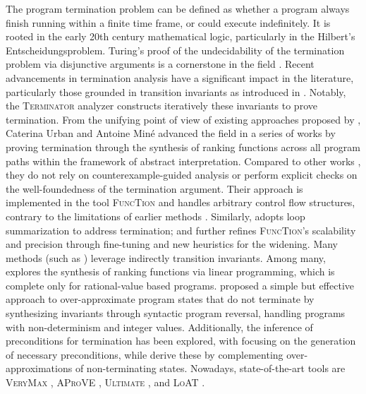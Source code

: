 The program termination problem can be defined as whether a program always finish running within a finite time frame, or could execute indefinitely.
It is rooted in the early 20th century mathematical logic, particularly in the Hilbert's Entscheidungsproblem. Turing's proof of the undecidability of the termination problem via disjunctive arguments is a cornerstone in the field .
Recent advancements in termination analysis have a significant impact in the literature, particularly those grounded in transition invariants as introduced in \textcite{Podelski2004}. Notably, the \textsc{Terminator} analyzer  constructs iteratively these invariants to prove termination.
From the unifying point of view of existing approaches proposed by ,
Caterina Urban and Antoine Min{\'{e}} advanced the field in a series of works  by proving termination through the synthesis of ranking functions across all program paths within the framework of abstract interpretation.
Compared to other works , they do not rely on counterexample-guided analysis or perform explicit checks on the well-foundedness of the termination argument.
Their approach is implemented in the tool \textsc{FuncTion}  and handles arbitrary control flow structures, contrary to the limitations of earlier methods .
Similarly,  adopts loop summarization to address termination; and  further refines \textsc{FuncTion}'s scalability and precision through fine-tuning and new heuristics for the widening.
Many methods (such as ) leverage indirectly transition invariants. Among many, \textcite{Alias2010} explores the synthesis of ranking functions via linear programming, which is complete only for rational-value based programs.
 proposed a simple but effective approach to over-approximate program states that do not terminate by synthesizing invariants through syntactic program reversal, handling programs with non-determinism and integer values.
Additionally, the inference of preconditions for termination has been explored, with  focusing on the generation of necessary preconditions, while  derive these by complementing over-approximations of non-terminating states.
Nowadays, state-of-the-art tools are \textsc{VeryMax} , \textsc{AProVE} , \textsc{Ultimate} , and \textsc{LoAT} .
